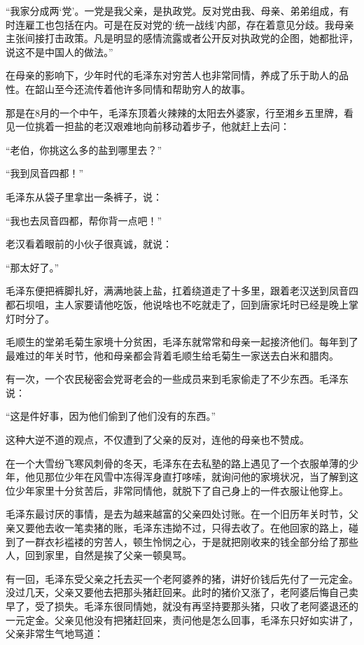 \documentclass[../../dazhuan.tex]{subfiles}
\begin{document}
“我家分成两‘党’。一党是我父亲，是执政党。反对党由我、母亲、弟弟组成，有时连雇工也包括在内。可是在反对党的‘统一战线’内部，存在着意见分歧。我母亲主张间接打击政策。凡是明显的感情流露或者公开反对执政党的企图，她都批评，说这不是中国人的做法。”

在母亲的影响下，少年时代的毛泽东对穷苦人也非常同情，养成了乐于助人的品性。在韶山至今还流传着他许多同情和帮助穷人的故事。

那是在8月的一个中午，毛泽东顶着火辣辣的太阳去外婆家，行至湘乡五里牌，看见一位挑着一担盐的老汉艰难地向前移动着步子，他就赶上去问：

“老伯，你挑这么多的盐到哪里去？”

“我到凤音四都！”

毛泽东从袋子里拿出一条裤子，说：

“我也去凤音四都，帮你背一点吧！”

老汉看着眼前的小伙子很真诚，就说：

“那太好了。”

毛泽东便把裤脚扎好，满满地装上盐，扛着绕道走了十多里，跟着老汉送到凤音四都石坝咀，主人家要请他吃饭，他说啥也不吃就走了，回到唐家圫时已经是晚上掌灯时分了。

毛顺生的堂弟毛菊生家境十分贫困，毛泽东就常常和母亲一起接济他们。每年到了最难过的年关时节，他和母亲都会背着毛顺生给毛菊生一家送去白米和腊肉。

有一次，一个农民秘密会党哥老会的一些成员来到毛家偷走了不少东西。毛泽东说：

“这是件好事，因为他们偷到了他们没有的东西。”

这种大逆不道的观点，不仅遭到了父亲的反对，连他的母亲也不赞成。

在一个大雪纷飞寒风刺骨的冬天，毛泽东在去私塾的路上遇见了一个衣服单薄的少年，他见那位少年在风雪中冻得浑身直打哆嗦，就询问他的家境状况，当了解到这位少年家里十分贫苦后，非常同情他，就脱下了自己身上的一件衣服让他穿上。

毛泽东最讨厌的事情，是去为越来越富的父亲四处讨账。在一个旧历年关时节，父亲又要他去收一笔卖猪的账，毛泽东违拗不过，只得去收了。在他回家的路上，碰到了一群衣衫褴褛的穷苦人，顿生怜悯之心，于是就把刚收来的钱全部分给了那些人，回到家里，自然是挨了父亲一顿臭骂。

有一回，毛泽东受父亲之托去买一个老阿婆养的猪，讲好价钱后先付了一元定金。没过几天，父亲又要他去把那头猪赶回来。此时的猪价又涨了，老阿婆后悔自己卖早了，受了损失。毛泽东很同情她，就没有再坚持要那头猪，只收了老阿婆退还的一元定金。父亲见他没有把猪赶回来，责问他是怎么回事，毛泽东只好如实讲了，父亲非常生气地骂道：
\end{document}
